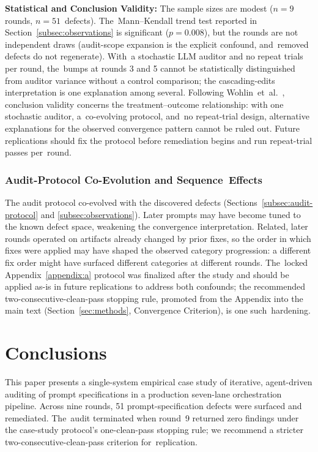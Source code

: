 \documentclass[software,article,accept,pdftex,oneauthor]{Definitions/mdpi}
\begin{document}
\textbf{Statistical and Conclusion Validity:} The sample sizes are modest ($n = 9$ rounds, \mbox{$n = 51$ defects}). The~Mann--Kendall trend test reported in Section~\ref{subsec:observations} is significant ($p = 0.008$), but the rounds are not independent draws (audit-scope expansion is the explicit confound, and~removed defects do not regenerate). With~a stochastic LLM auditor and no repeat trials per round, the~bumps at rounds 3 and 5 cannot be statistically distinguished from auditor variance without a control comparison; the cascading-edits interpretation is one explanation among several. Following Wohlin~et~al.~\cite{wohlin2012experimentation}, conclusion validity concerns the treatment--outcome relationship: with one stochastic auditor, a~co-evolving protocol, and~no repeat-trial design, alternative explanations for the observed convergence pattern cannot be ruled out. Future replications should fix the protocol before remediation begins and run repeat-trial passes per~round.

\subsubsection{Audit-Protocol Co-Evolution and Sequence~Effects}

The audit protocol co-evolved with the discovered defects (Sections~\ref{subsec:audit-protocol} and \ref{subsec:observations}). Later prompts may have become tuned to the known defect space, weakening the convergence interpretation. Related, later rounds operated on artifacts already changed by prior fixes, so the order in which fixes were applied may have shaped the observed category progression: a different fix order might have surfaced different categories at different rounds. The~locked Appendix~\ref{appendix:a} protocol was finalized after the study and should be applied as-is in future replications to address both confounds; the recommended two-consecutive-clean-pass stopping rule, promoted from the Appendix into the main text (Section~\ref{sec:methods}, Convergence Criterion), is one such~hardening.

\section{Conclusions}
\label{sec:conclusions}

This paper presents a single-system empirical case study of iterative, agent-driven auditing of prompt specifications in a production seven-lane orchestration pipeline. Across nine rounds, 51 prompt-specification defects were surfaced and remediated. The~audit terminated when round~9 returned zero findings under the case-study protocol's one-clean-pass stopping rule; we recommend a stricter two-consecutive-clean-pass criterion for~replication.
\end{document}
